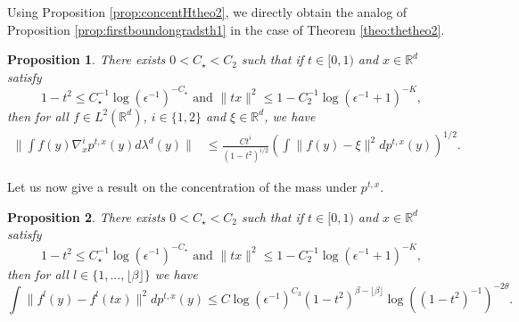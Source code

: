\documentclass{article}
\newtheorem{proposition}{Proposition}
\begin{document}
Using Proposition \ref{prop:concentHtheo2}, we directly obtain the analog of Proposition \ref{prop:firstboundongradsth1} in the case of Theorem \ref{theo:thetheo2}.
\begin{proposition}\label{prop:firstboundongradsth2} There exists  $0<C_\star<C_2$ such that if $t\in [0,1)$  and $x\in \mathbb{R}^d$ satisfy \begin{equation}\label{eq:hyp13}
1-t^2\leq C_\star^{-1}\log(\epsilon^{-1})^{-C_\star} \text{ and } \|tx\|^2\leq 1-C_2^{-1}\log(\epsilon^{-1}+1)^{-K},
\end{equation}
    then for all $f\in L^2(\mathbb{R}^d)$, $i\in \{1,2\}$ and $\xi\in \mathbb{R}^d$, we have
    \begin{align*}
    \|\int f(y) \nabla_x^i p^{t,x}(y)d\lambda^d(y)\| 
    &\leq \frac{Ct^i}{(1-t^2)^{i/2}}\left(\int \|f(y)-\xi\|^2dp^{t,x}(y)\right)^{1/2}.
\end{align*}
\end{proposition}
Let us now give a result on the concentration of the mass under $p^{t,x}$.

\begin{proposition}\label{prop:concentration3}
There exists  $0<C_\star<C_2$ such that if $t\in [0,1)$  and $x\in \mathbb{R}^d$ satisfy \begin{equation}\label{eq:hyp14}
1-t^2\leq C_\star^{-1}\log(\epsilon^{-1})^{-C_\star} \text{ and } \|tx\|^2\leq 1-C_2^{-1}\log(\epsilon^{-1}+1)^{-K},
\end{equation}
then for all $l\in \{1,...,\lfloor \beta \rfloor\}$ we have
    $$\int \|f^l(y)-f^l(tx)\|^2dp^{t,x}(y)\leq C\log(\epsilon^{-1})^{C_3}(1-t^2)^{\beta-\lfloor \beta \rfloor }\log((1-t^2)^{-1})^{-2\theta}.$$
\end{proposition}
\end{document}
